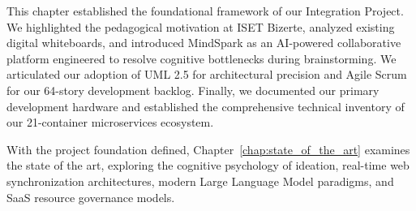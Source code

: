 This chapter established the foundational framework of our Integration Project. We highlighted the pedagogical motivation at ISET Bizerte, analyzed existing digital whiteboards, and introduced MindSpark as an AI-powered collaborative platform engineered to resolve cognitive bottlenecks during brainstorming. We articulated our adoption of UML 2.5 for architectural precision and Agile Scrum for our 64-story development backlog. Finally, we documented our primary development hardware and established the comprehensive technical inventory of our 21-container microservices ecosystem.

With the project foundation defined, Chapter~\ref{chap:state_of_the_art} examines the state of the art, exploring the cognitive psychology of ideation, real-time web synchronization architectures, modern Large Language Model paradigms, and SaaS resource governance models.
